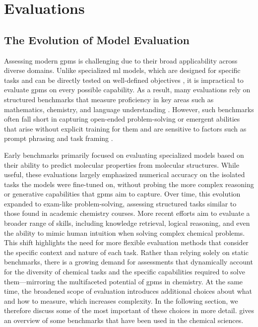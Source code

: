 \section{Evaluations} \label{sec:evals}
\subsection{The Evolution of Model Evaluation}

Assessing modern \glspl{gpm} is challenging due to their broad applicability across diverse domains. 
Unlike specialized \gls{ml} models, which are designed for specific tasks and can be directly tested on well-defined objectives \autocite{raschka2018model}, it is impractical to evaluate \glspl{gpm} on every possible capability. As a result, many evaluations rely on structured benchmarks that measure proficiency in key areas such as mathematics, chemistry, and language understanding \autocite{tikhonov2023post}. 
However, such benchmarks often fall short in capturing open-ended problem-solving or emergent abilities that arise without explicit training for them and are sensitive to factors such as prompt phrasing and task framing \autocite{Siska2024, Andriushchenko2024agent}.

Early benchmarks primarily focused on evaluating specialized models based on their ability to predict molecular properties from molecular structures. \autocite{wu2018moleculenet} 
While useful, these evaluations largely emphasized numerical accuracy on the isolated tasks the models were fine-tuned on, without probing the more complex reasoning or generative capabilities that \glspl{gpm} aim to capture. 
Over time, this evolution expanded to exam-like problem-solving, assessing structured tasks similar to those found in academic chemistry courses. \autocite{zaki2023mascqa0, li2023camel} 
More recent efforts aim to evaluate a broader range of skills, including knowledge retrieval, logical reasoning, and even the ability to mimic human intuition when solving complex chemical problems.\autocite{feng2024sciknoweval0, mirza2024large} 
This shift highlights the need for more flexible evaluation methods that consider the specific context and nature of each task. Rather than relying solely on static benchmarks, there is a growing demand for assessments that dynamically account for the diversity of chemical tasks and the specific capabilities required to solve them---mirroring the multifaceted potential of \glspl{gpm} in chemistry. At the same time, the broadened scope of evaluation introduces additional choices about what and how to measure, which increases complexity. In the following section, we therefore discuss some of the most important of these choices in more detail.  gives an overview of some benchmarks that have been used in the chemical sciences.


